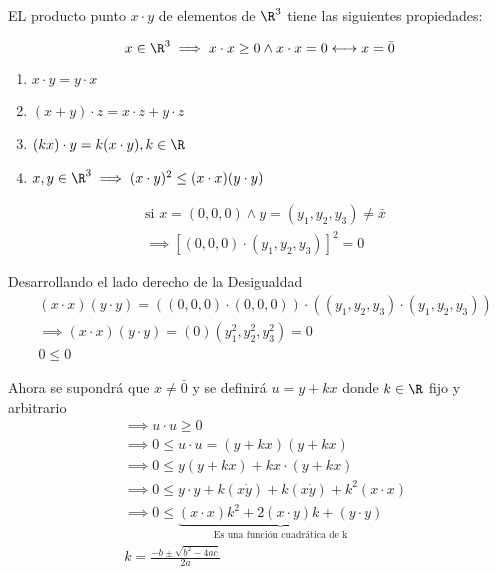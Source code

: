 EL producto punto $x\cdot y$ de elementos de $\R^3$ tiene las siguientes propiedades:

\begin{equation}
	x\in \R^3\implies x\cdot x \geq 0\land x\cdot x=0\longleftrightarrow x=\bar{0}
\end{equation}

\begin{enumerate}
	\item $x\cdot y=y\cdot x$
	\item $(x+y)\cdot z=x\cdot z+y\cdot z$
	\item $(kx)\cdot y=k(x\cdot y), k\in \R$
	\item $x,y\in \R^3\implies (x\cdot y)^2 \leq (x\cdot x)(y\cdot y)$
\end{enumerate}

\begin{exercise}
	\begin{align*}
		 & \text{si } x=(0,0,0)\land y=(y_1,y_2,y_3)\neq \bar{x} \\
		 & \implies \left[(0,0,0)\cdot (y_1,y_2,y_3)\right]^2=0
	\end{align*}

	Desarrollando el lado derecho de la Desigualdad
	\begin{align*}
		 & (x\cdot x)(y\cdot y)=\left((0,0,0)\cdot (0,0,0)\right)\cdot \left((y_1,y_2,y_3)\cdot (y_1,y_2,y_3)\right) \\
		 & \implies (x\cdot x)(y\cdot y)=(0)\left(y^2_1,y^2_2,y^2_3\right)=0                                         \\
		 & 0\leq 0
	\end{align*}

	Ahora se supondrá que $x\neq \bar{0}$ y se definirá $u=y+kx$ donde $k\in \R$ fijo y arbitrario
	\begin{align*}
		 & \implies u\cdot u \geq 0                                                                                  \\
		 & \implies 0\leq u\cdot u=(y+kx)(y+kx)                                                                      \\
		 & \implies 0\leq y(y+kx)+kx\cdot (y+kx)                                                                     \\
		 & \implies 0\leq y\cdot y+k(x\dot y)+k(x\dot y)+k^2(x\cdot x)                                               \\
		 & \implies 0\leq \underbrace{(x\cdot x)k^2+2(x\cdot y)k+(y\cdot y)}_{\text{Es una función cuadrática de k}} \\
		 & k=\frac{-b\pm \sqrt{b^2-4ac}}{2a}
	\end{align*}


\end{exercise}
